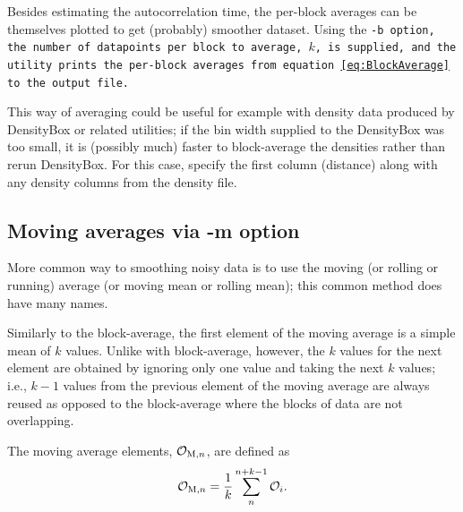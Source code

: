 Besides estimating the autocorrelation time, the per-block averages can be
themselves plotted to get (probably) smoother dataset. Using the \tt{-b} option,
the number of datapoints per block to average, $k$, is supplied, and the utility
prints the per-block averages from equation~\eqref{eq:BlockAverage} to the
output file.

This way of averaging could be useful for example with density data produced by
DensityBox or related utilities; if the bin width supplied to the DensityBox was
too small, it is (possibly much) faster to block-average the densities rather
than rerun DensityBox. For this case, specify the first column (distance) along
with any density columns from the density file.

\subsection{Moving averages via -m option}

More common way to smoothing noisy data is to use the moving (or rolling or
running) average (or moving mean or rolling mean); this common method does have
many names.

Similarly to the block-average, the first element of the moving average is a
simple mean of $k$ values. Unlike with block-average, however, the $k$ values
for the next element are obtained by ignoring only one value and taking the next
$k$ values; i.e., $k-1$ values from the previous element of the moving average
are always reused as opposed to the block-average where the blocks of data are
not overlapping.

The moving average elements, $\mathcal{O}_{\mathrm{M},n}$, are defined as
\begin{equation} \label{eq:MovingAverage}
  \mathcal{O}_{\mathrm{M},n} = \frac{1}{k}
    \sum^{n+k-1}_{n} \mathcal{O}_i.
\end{equation}

